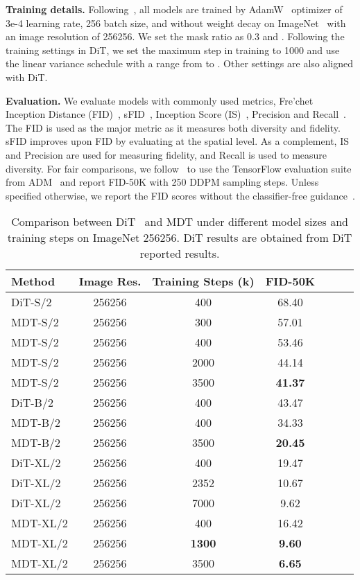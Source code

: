 \documentclass[final]{cvpr}
\newcommand{\myPara}[1]{\vspace{.08in} \noindent\textbf{#1}}
\begin{document}
\myPara{Training details.}
Following~\cite{peebles2022scalable},
all models are trained by AdamW~\cite{loshchilov2017decoupled} optimizer
of 3e-4 learning rate, 256 batch size, and without weight decay on ImageNet~\cite{imagenet_cvpr09} 
with an image resolution of 256256.
We set the mask ratio as 0.3 and . 
Following the training settings in DiT,
we set the maximum step in training to 1000 and use the linear
variance schedule with a range from  to .
Other settings are also aligned with DiT.




\myPara{Evaluation.}
We evaluate models with commonly used metrics,
\ie Fre'chet Inception Distance (FID)~\cite{heusel2017gans},
sFID~\cite{nash2021generating}, Inception Score (IS)~\cite{salimans2016improved}, 
Precision and Recall~\cite{kynkaanniemi2019improved}.
The FID is used as the major metric as it measures both diversity and fidelity.
sFID improves upon FID by evaluating at the spatial level.
As a complement, IS and Precision are used for measuring fidelity,
and Recall is used to measure diversity.
For fair comparisons, we follow~\cite{peebles2022scalable}
to use the TensorFlow evaluation suite from ADM~\cite{dhariwal2021diffusion}
and report FID-50K with 250 DDPM sampling steps.
Unless specified otherwise,
we report the FID scores without the classifier-free guidance~\cite{ho2022classifier}.



\begin{table}
\centering
\setlength{\tabcolsep}{2.2mm} \small
\begin{tabular}{lcccccc}
\toprule
Method & Image Res. & Training Steps (k) & FID-50K  \\	\midrule
DiT-S/2 & 256256 & 400 & 68.40   \\ 
\hdashline
MDT-S/2 & 256256 & 300 & 57.01   \\
MDT-S/2 & 256256 & 400 & 53.46   \\
MDT-S/2 & 256256 & 2000 & 44.14  \\ 
MDT-S/2 & 256256 & 3500 & \textbf{41.37}  \\ 
\midrule
DiT-B/2 & 256256 & 400 & 43.47   \\ \hdashline
MDT-B/2 & 256256 & 400 & 34.33   \\
MDT-B/2 & 256256 & 3500 & \textbf{20.45}  \\
\midrule
DiT-XL/2 & 256256 & 400 & 19.47   \\
DiT-XL/2  & 256256 & 2352 & 10.67   \\
DiT-XL/2  & 256256 & 7000 & 9.62   \\
\hdashline
MDT-XL/2 & 256256 & 400 & 16.42    \\
MDT-XL/2 & 256256 & \textbf{1300} & \textbf{9.60}    \\
MDT-XL/2 & 256256 & 3500 & \textbf{6.65}    \\
\bottomrule
\end{tabular}
\vspace{2pt}
\caption{Comparison between DiT~\cite{peebles2022scalable} and MDT under 
different model sizes and training steps on ImageNet 256256. 
DiT results are obtained from DiT reported results.
}
\label{tab:ditvsmdt}
\end{table}
\end{document}

